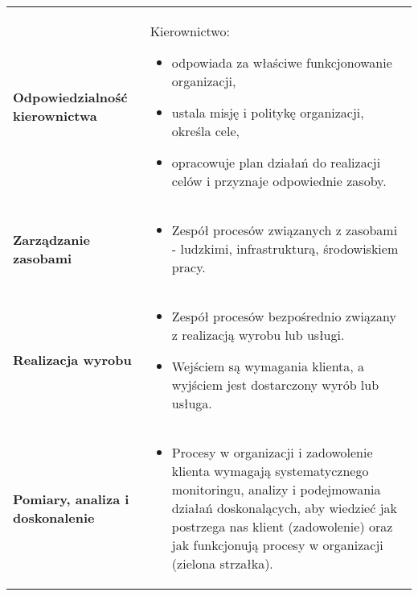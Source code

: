 \documentclass[a4paper]{article}
\begin{document}
    \begin{table}[H]
        \begin{center}
            \begin{tabular}{ p{8cm} p{8cm} }
                \textbf{Odpowiedzialność kierownictwa}
                &
                Kierownictwo:
                \begin{itemize}
                    \item odpowiada za właściwe funkcjonowanie organizacji,
                    \item ustala misję i politykę organizacji, określa cele,
                    \item opracowuje plan
                    działań do realizacji celów i przyznaje odpowiednie zasoby.
                \end{itemize}
                \\

                \textbf{Zarządzanie zasobami}
                &
                \begin{itemize}
                    \item Zespół procesów związanych z zasobami - ludzkimi, infrastrukturą, środowiskiem pracy.
                \end{itemize}
                \\

                \textbf{Realizacja wyrobu}
                &
                \begin{itemize}
                    \item Zespół procesów bezpośrednio związany z
                    realizacją wyrobu lub usługi.
                    \item Wejściem są wymagania klienta, a wyjściem jest
                    dostarczony wyrób lub usługa.
                \end{itemize}
                \\

                \textbf{Pomiary, analiza i doskonalenie}
                &
                \begin{itemize}
                    \item Procesy w organizacji i zadowolenie klienta
                    wymagają systematycznego monitoringu, analizy i
                    podejmowania działań doskonalących, aby wiedzieć
                    jak postrzega nas klient (zadowolenie) oraz jak
                    funkcjonują procesy w organizacji (zielona strzałka).
                \end{itemize}
                \\


\end{tabular}
\end{center}
\end{table}
\end{document}
